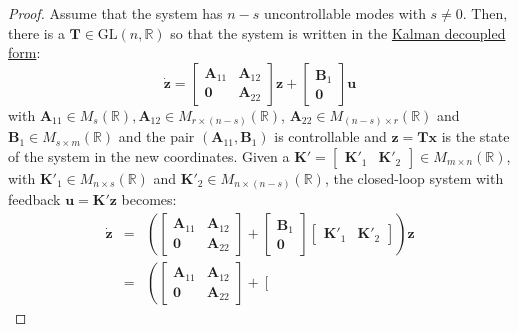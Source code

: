 \documentclass[a4paper,10pt,oneside]{book}
\begin{document}
\begin{proof}
 Assume that the system has $n-s$ uncontrollable modes with $s\neq 0$. Then, there is a $\mathbf{T}\in\text{GL}(n,\mathbb{R})$ so that the system is written in the \hyperlink{prop:InputDecoupling}{Kalman decoupled form}:
\begin{equation}
 \dot{\mathbf{z}}=\left[ {\begin{array}{cc}
      \mathbf{A}_{11} & \mathbf{A}_{12} \\ 
      \mathbf{0} & \mathbf{A}_{22}
\end{array} } \right]\mathbf{z}+\left[ {\begin{array}{c}
      \mathbf{B}_{1} \\ 
      \mathbf{0}
\end{array} } \right]\mathbf{u}
\end{equation}
with $\mathbf{A}_{11}\in M_s(\mathbb{R}),\mathbf{A}_{12}\in M_{r\times(n-s)}(\mathbb{R})$, $\mathbf{A}_{22}\in M_{(n-s)\times r}(\mathbb{R})$ and $\mathbf{B}_{1}\in M_{s \times m}(\mathbb{R})$ and the pair $(\mathbf{A}_{11},\mathbf{B}_{1})$ is controllable and $\mathbf{z}=\mathbf{Tx}$ is the state of the system in the new coordinates. Given a $\mathbf{K}'=\left[ {\begin{array}{cc}\mathbf{K}'_1 & \mathbf{K}'_2 \end{array} } \right]\in M_{m\times n}(\mathbb{R})$, with $\mathbf{K}'_1\in M_{n\times s}(\mathbb{R})$ and $\mathbf{K}'_2\in M_{n\times (n-s)}(\mathbb{R})$, the closed-loop system with feedback  $\mathbf{u}=\mathbf{K}'\mathbf{z}$ becomes:
\begin{eqnarray}
 \dot{\mathbf{z}}&=&\left(\left[ {\begin{array}{cc}
      \mathbf{A}_{11} & \mathbf{A}_{12} \\ 
      \mathbf{0} & \mathbf{A}_{22}
\end{array} } \right]+\left[ {\begin{array}{c}
      \mathbf{B}_{1} \\ 
      \mathbf{0}
\end{array} } \right]\left[ {\begin{array}{cc}\mathbf{K}'_1 & \mathbf{K}'_2 \end{array} } \right]\right)\mathbf{z}\\
&=&\left(\left[ {\begin{array}{cc}
      \mathbf{A}_{11} & \mathbf{A}_{12} \\ 
      \mathbf{0} & \mathbf{A}_{22}
\end{array} } \right]+\left[ {\begin{array}{cc}

\end{array}}
\end{eqnarray}
\end{proof}
\end{document}
